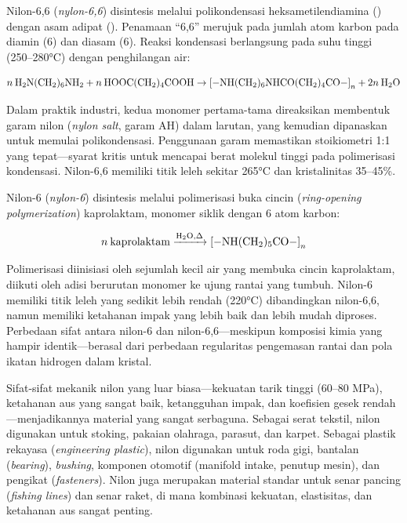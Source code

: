 \documentclass[12pt,a4paper,openany]{book}
\begin{document}
Nilon-6,6 (\textit{nylon-6,6}) disintesis melalui polikondensasi heksametilendiamina () dengan asam adipat (). Penamaan ``6,6'' merujuk pada jumlah atom karbon pada diamin (6) dan diasam (6). Reaksi kondensasi berlangsung pada suhu tinggi (250--280°C) dengan penghilangan air:

\begin{equation}
n\:\ce{H2N(CH2)6NH2} + n\:\ce{HOOC(CH2)4COOH} \rightarrow \ce{[-NH(CH2)6NHCO(CH2)4CO-]}_n + 2n\:\ce{H2O}
\end{equation}

Dalam praktik industri, kedua monomer pertama-tama direaksikan membentuk garam nilon (\textit{nylon salt}, garam AH) dalam larutan, yang kemudian dipanaskan untuk memulai polikondensasi. Penggunaan garam memastikan stoikiometri 1:1 yang tepat---syarat kritis untuk mencapai berat molekul tinggi pada polimerisasi kondensasi. Nilon-6,6 memiliki titik leleh sekitar 265°C dan kristalinitas 35--45\%.

Nilon-6 (\textit{nylon-6}) disintesis melalui polimerisasi buka cincin (\textit{ring-opening polymerization}) kaprolaktam, monomer siklik dengan 6 atom karbon:

\begin{equation}
n\:\text{kaprolaktam} \xrightarrow{\ce{H2O}, \Delta} \ce{[-NH(CH2)5CO-]}_n
\end{equation}

Polimerisasi diinisiasi oleh sejumlah kecil air yang membuka cincin kaprolaktam, diikuti oleh adisi berurutan monomer ke ujung rantai yang tumbuh. Nilon-6 memiliki titik leleh yang sedikit lebih rendah (220°C) dibandingkan nilon-6,6, namun memiliki ketahanan impak yang lebih baik dan lebih mudah diproses. Perbedaan sifat antara nilon-6 dan nilon-6,6---meskipun komposisi kimia yang hampir identik---berasal dari perbedaan regularitas pengemasan rantai dan pola ikatan hidrogen dalam kristal.

Sifat-sifat mekanik nilon yang luar biasa---kekuatan tarik tinggi (60--80 MPa), ketahanan aus yang sangat baik, ketangguhan impak, dan koefisien gesek rendah---menjadikannya material yang sangat serbaguna. Sebagai serat tekstil, nilon digunakan untuk stoking, pakaian olahraga, parasut, dan karpet. Sebagai plastik rekayasa (\textit{engineering plastic}), nilon digunakan untuk roda gigi, bantalan (\textit{bearing}), \textit{bushing}, komponen otomotif (manifold intake, penutup mesin), dan pengikat (\textit{fasteners}). Nilon juga merupakan material standar untuk senar pancing (\textit{fishing lines}) dan senar raket, di mana kombinasi kekuatan, elastisitas, dan ketahanan aus sangat penting.
\end{document}
